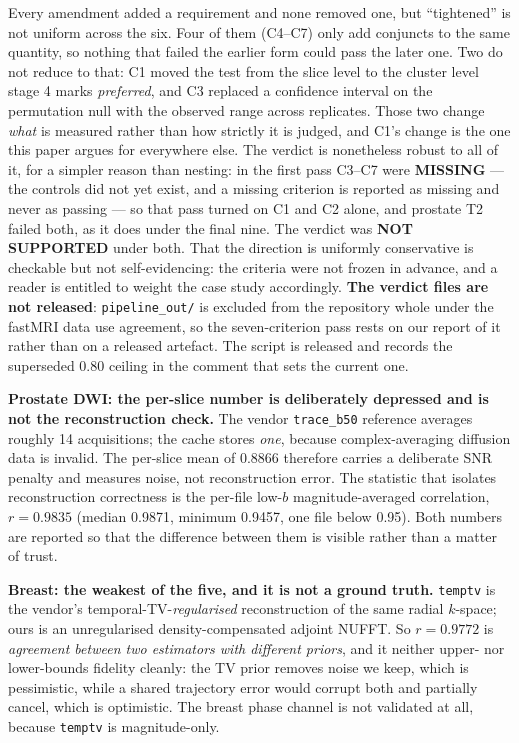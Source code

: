 \documentclass[11pt,a4paper]{article}
\begin{document}
Every amendment added a requirement and none removed one, but ``tightened'' is not
uniform across the six. Four of them (C4--C7) only add conjuncts to the same quantity,
so nothing that failed the earlier form could pass the later one. Two do not reduce to
that: C1 moved the test from the slice level to the cluster level stage 4 marks
\emph{preferred}, and C3 replaced a confidence interval on the permutation null with
the observed range across replicates. Those two change \emph{what} is measured rather
than how strictly it is judged, and C1's change is the one this paper argues for
everywhere else. The verdict is nonetheless robust to all of it, for a simpler reason
than nesting: in the first pass C3--C7 were \textbf{MISSING} --- the controls did not
yet exist, and a missing criterion is reported as missing and never as passing --- so
that pass turned on C1 and C2 alone, and prostate T2 failed both, as it does under the
final nine. The verdict was \textbf{NOT SUPPORTED} under both. That the
direction is uniformly conservative is checkable but not self-evidencing: the criteria
were not frozen in advance, and a reader is entitled to weight the case study
accordingly. \textbf{The verdict files are not released}: \texttt{pipeline\_out/} is
excluded from the repository whole under the fastMRI data use agreement, so the
seven-criterion pass rests on our report of it rather than on a released artefact. The
script is released and records the superseded 0.80 ceiling in the comment that sets
the current one.

\textbf{Prostate DWI: the per-slice number is deliberately depressed and is not the
reconstruction check.} The vendor \texttt{trace\_b50} reference averages roughly 14
acquisitions; the cache stores \emph{one}, because complex-averaging diffusion data is
invalid. The per-slice mean of 0.8866 therefore carries a deliberate SNR penalty and
measures noise, not reconstruction error. The statistic that isolates reconstruction
correctness is the per-file low-$b$ magnitude-averaged correlation, $r = 0.9835$
(median 0.9871, minimum 0.9457, one file below 0.95). Both numbers are reported so
that the difference between them is visible rather than a matter of trust.

\textbf{Breast: the weakest of the five, and it is not a ground truth.}
\texttt{temptv} is the vendor's temporal-TV-\emph{regularised} reconstruction of the
same radial $k$-space; ours is an unregularised density-compensated adjoint NUFFT.
So $r = 0.9772$ is \emph{agreement between two estimators with different priors}, and
it neither upper- nor lower-bounds fidelity cleanly: the TV prior removes noise we
keep, which is pessimistic, while a shared trajectory error would corrupt both and
partially cancel, which is optimistic. The breast phase channel is not validated at
all, because \texttt{temptv} is magnitude-only.
\end{document}

